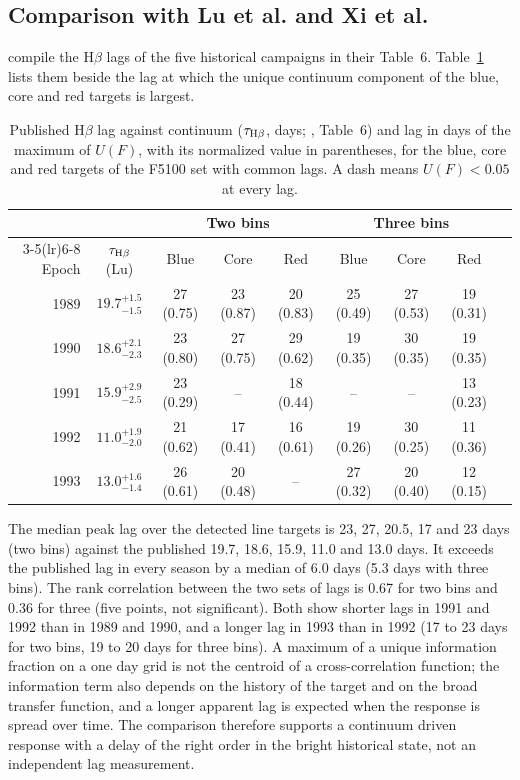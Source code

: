 \documentclass[fleqn,usenatbib]{mnras}
\newenvironment{SURDtable}{\begin{table}}{\end{table}}
\begin{document}
\subsection{Comparison with Lu et al. and Xi et al.}

\citet{Lu2022} compile the H$\beta$ lags of the five historical campaigns in their
Table~6. Table~\ref{tab:ep_lu} lists them beside the lag at which the unique
continuum component of the blue, core and red targets is largest.

\begin{SURDtable}
\centering
\caption{Published H$\beta$ lag against continuum ($\tau_{\rm H\beta}$, days;
\citealt{Lu2022}, Table~6) and lag in days of the maximum of $U(F)$, with its
normalized value in parentheses, for the blue, core and red targets of the F5100 set
with common lags. A dash means $U(F)<0.05$ at every lag.}
\label{tab:ep_lu}
\footnotesize
\setlength{\tabcolsep}{3pt}
\begin{tabular}{rcccccccc}
\toprule
 & & \multicolumn{3}{c}{Two bins} & \multicolumn{3}{c}{Three bins} \\
\cmidrule(lr){3-5}\cmidrule(lr){6-8}
Epoch & $\tau_{\rm H\beta}$ (Lu) & Blue & Core & Red & Blue & Core & Red \\
\midrule
1989 & $19.7^{+1.5}_{-1.5}$ & 27 (0.75) & 23 (0.87) & 20 (0.83) & 25 (0.49) & 27 (0.53) & 19 (0.31) \\
1990 & $18.6^{+2.1}_{-2.3}$ & 23 (0.80) & 27 (0.75) & 29 (0.62) & 19 (0.35) & 30 (0.35) & 19 (0.35) \\
1991 & $15.9^{+2.9}_{-2.5}$ & 23 (0.29) & -- & 18 (0.44) & -- & -- & 13 (0.23) \\
1992 & $11.0^{+1.9}_{-2.0}$ & 21 (0.62) & 17 (0.41) & 16 (0.61) & 19 (0.26) & 30 (0.25) & 11 (0.36) \\
1993 & $13.0^{+1.6}_{-1.4}$ & 26 (0.61) & 20 (0.48) & -- & 27 (0.32) & 20 (0.40) & 12 (0.15) \\
\bottomrule
\end{tabular}

\end{SURDtable}

The median peak lag over the detected line targets is 23, 27, 20.5, 17 and 23 days
(two bins) against the published 19.7, 18.6, 15.9, 11.0 and 13.0 days. It exceeds
the published lag in every season by a median of 6.0 days (5.3 days with three
bins). The rank correlation between the two sets of lags is 0.67 for two bins and
0.36 for three (five points, not significant). Both show shorter lags in 1991 and
1992 than in 1989 and 1990, and a longer lag in 1993 than in 1992 (17 to 23 days for
two bins, 19 to 20 days for three bins). A maximum of a unique information fraction on a one day grid is
not the centroid of a cross-correlation function; the information term also
depends on the history of the target and on the broad transfer function, and a
longer apparent lag is expected when the response is spread over time. The comparison
therefore supports a continuum driven response with a delay of the right order in
the bright historical state, not an independent lag measurement.
\end{document}
